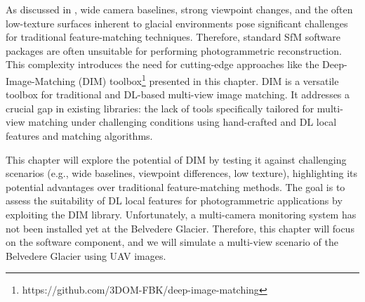 As discussed in , wide camera baselines, strong viewpoint changes, and the often low-texture surfaces inherent to glacial environments pose significant challenges for traditional feature-matching techniques.
Therefore, standard SfM software packages are often unsuitable for performing photogrammetric reconstruction.
This complexity introduces the need for cutting-edge approaches like the Deep-Image-Matching (DIM) toolbox\footnote{https://github.com/3DOM-FBK/deep-image-matching} presented in this chapter.
DIM is a versatile toolbox for traditional and DL-based multi-view image matching. 
It addresses a crucial gap in existing libraries: the lack of tools specifically tailored for multi-view matching under challenging conditions using hand-crafted and DL local features and matching algorithms.

This chapter will explore the potential of DIM by testing it against challenging scenarios (e.g., wide baselines, viewpoint differences, low texture), highlighting its potential advantages over traditional feature-matching methods.  
The goal is to assess the suitability of DL local features for photogrammetric applications by exploiting the DIM library.
Unfortunately, a multi-camera monitoring system has not been installed yet at the Belvedere Glacier. 
Therefore, this chapter will focus on the software component, and we will simulate a multi-view scenario of the Belvedere Glacier using UAV images. 


